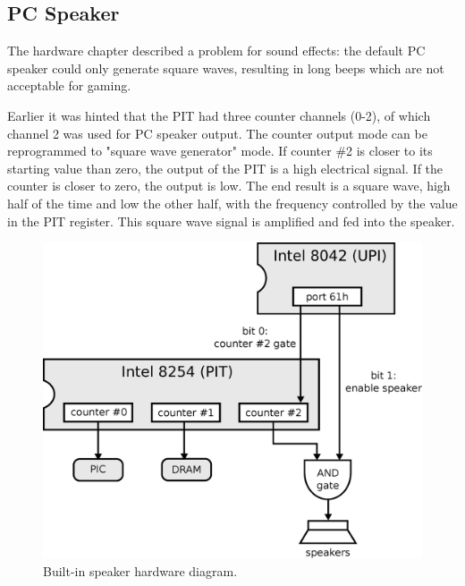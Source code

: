 \documentclass[book.tex]{subfiles}
\begin{document}
\begin{minipage}{\textwidth}

\end{minipage}



\subsection{PC Speaker}
The hardware chapter described a problem for sound effects: the default PC speaker could only generate square waves, resulting in long beeps which are not acceptable for gaming.\\

\par
Earlier it was hinted that the PIT had three counter channels (0-2), of which channel 2 was used for PC speaker output. The counter output mode can be reprogrammed to "square wave generator" mode. If counter \#2 is closer to its starting value than zero, the output of the PIT is a high electrical signal. If the counter is closer to zero, the output is low. The end result is a square wave, high half of the time and low the other half, with the frequency controlled by the value in the PIT register. This square wave signal is amplified and fed into the speaker. \\

\par
\begin{figure}[H]
  \centering
  \includegraphics[width=1.0\textwidth]{imgs/drawings/pc_speaker.eps}
  \caption{Built-in speaker hardware diagram.}
  \label{fig:pc_speaker}
\end{figure}
\end{document}
